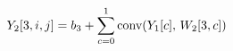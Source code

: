 \documentclass[preview]{standalone}
\begin{document}
\begin{align*}
\special{dvisvgm:raw <g id='unique000'>}Y_2[3,i,j]=b_3+\sum_{c=0}^{1}\text{conv}(Y_1[c],\,W_2[3,c])\special{dvisvgm:raw </g>}
\end{align*}
\end{document}
